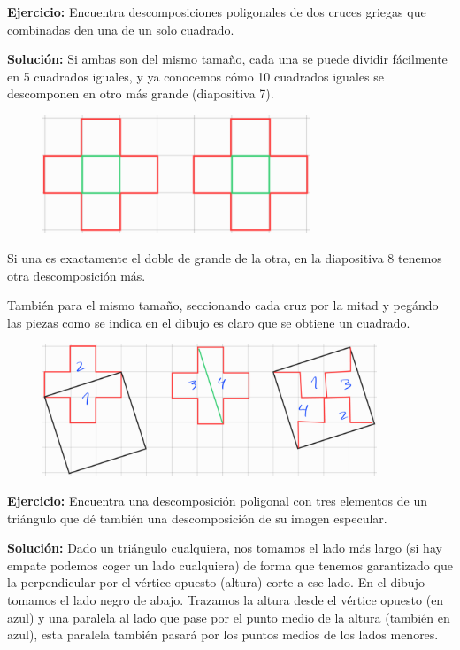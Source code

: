 \documentclass{amsart}
\begin{document}
\textbf{Ejercicio:} Encuentra descomposiciones poligonales de dos cruces griegas
que combinadas den una de un solo cuadrado.

\bigskip

\textbf{Solución:} Si ambas son del mismo tamaño, cada una se puede dividir fácilmente en 5 cuadrados iguales, y ya conocemos cómo 10 cuadrados iguales se descomponen en otro más grande (diapositiva 7).

\begin{figure}[H]
	\includegraphics[width=80mm]{imgs/cruces-cuadrado1}
\end{figure}

Si una es exactamente el doble de grande de la otra, en la diapositiva 8 tenemos otra descomposición más.

También para el mismo tamaño, seccionando cada cruz por la mitad y pegándo las piezas como se indica en el dibujo es claro que se obtiene un cuadrado.

\begin{figure}[H]
	\includegraphics[width=100mm]{imgs/cruces-cuadrado2}
\end{figure}

\bigskip

\textbf{Ejercicio:} Encuentra una descomposición poligonal con tres elementos
de un triángulo que dé también una descomposición de su
imagen especular.

\bigskip

\textbf{Solución:} Dado un triángulo cualquiera, nos tomamos el lado más largo (si hay empate podemos coger un lado cualquiera) de forma que tenemos garantizado que la perpendicular por el vértice opuesto (altura) corte a ese lado. En el dibujo tomamos el lado negro de abajo. Trazamos la altura desde el vértice opuesto (en azul) y una paralela al lado que pase por el punto medio de la altura (también en azul), esta paralela también pasará por los puntos medios de los lados menores.
\end{document}
